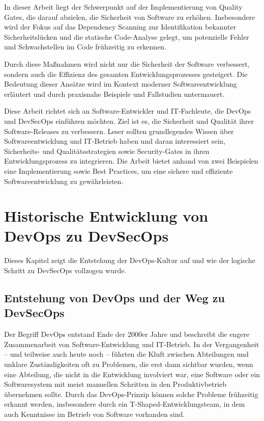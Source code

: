 \documentclass[conference,compsoc,final,a4paper]{IEEEtran}
\begin{document}
In dieser Arbeit liegt der Schwerpunkt auf der Implementierung von Quality Gates, die darauf abzielen, die Sicherheit von Software zu erhöhen. Insbesondere wird der Fokus auf das Dependency Scanning zur Identifikation bekannter Sicherheitslücken und die statische Code-Analyse gelegt, um potenzielle Fehler und Schwachstellen im Code frühzeitig zu erkennen.

Durch diese Maßnahmen wird nicht nur die Sicherheit der Software verbessert, sondern auch die Effizienz des gesamten Entwicklungsprozesses gesteigert. Die Bedeutung dieser Ansätze wird im Kontext moderner Softwareentwicklung erläutert und durch praxisnahe Beispiele und Fallstudien untermauert.

Diese Arbeit richtet sich an Software-Entwickler und IT-Fachleute, die DevOps und DevSecOps einführen möchten. Ziel ist es, die Sicherheit und Qualität ihrer Software-Releases zu verbessern. Leser sollten grundlegendes Wissen über Softwareentwicklung und IT-Betrieb haben und daran interessiert sein, Sicherheits- und Qualitätsstrategien sowie Security-Gates in ihren Entwicklungsprozess zu integrieren. Die Arbeit bietet anhand von zwei Beispielen eine Implementierung sowie Best Practices, um eine sichere und effiziente Softwareentwicklung zu gewährleisten.


\section{Historische Entwicklung von DevOps zu DevSecOps}
Dieses Kapitel zeigt die Entstehung der DevOps-Kultur auf und wie der logische Schritt zu DevSecOps vollzogen wurde.

\subsection{Entstehung von DevOps und der Weg zu DevSecOps}
Der Begriff DevOps entstand Ende der 2000er Jahre und beschreibt die engere Zusammenarbeit von Software-Entwicklung und IT-Betrieb. In der Vergangenheit – und teilweise auch heute noch – führten die Kluft zwischen Abteilungen und unklare Zuständigkeiten oft zu Problemen, die erst dann sichtbar wurden, wenn eine Abteilung, die nicht in die Entwicklung involviert war, eine Software oder ein Softwaresystem mit meist manuellen Schritten in den Produktivbetrieb übernehmen sollte. Durch das DevOps-Prinzip können solche Probleme frühzeitig erkannt werden, insbesondere durch ein T-Shaped-Entwicklungsteam, in dem auch Kenntnisse im Betrieb von Software vorhanden sind.
\end{document}
